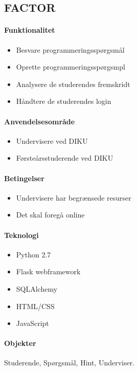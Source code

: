 \documentclass[11pt, a4paper]{article}
\begin{document}
\subsection{FACTOR}
\label{sub:factor}
\paragraph{Funktionalitet}
\begin{itemize}
    \item Besvare programmeringsspørgsmål
    \item Oprette programmeringsspørgsmpl
    \item Analysere de studerendes fremskridt
    \item Håndtere de studerendes login
\end{itemize}

\paragraph{Anvendelsesområde}
\begin{itemize}
    \item Undervisere ved DIKU
    \item Førsteårsstuderende ved DIKU
\end{itemize}

\paragraph{Betingelser}
\begin{itemize}
    \item Undervisere har begrænsede resurser
    \item Det skal foregå online
\end{itemize}

\paragraph{Teknologi}
\begin{itemize}
    \item Python 2.7
    \item Flask webframework
    \item SQLAlchemy
    \item HTML/CSS
    \item JavaScript
\end{itemize}

\paragraph{Objekter}
Studerende, Spørgsmål, Hint, Underviser.
\end{document}
